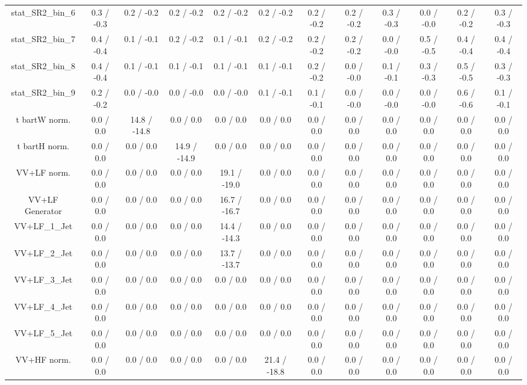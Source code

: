 \begin{table}[htbp]
\begin{center}
\begin{tabular}{|c|c|c|c|c|c|c|c|c|c|c|c|}
 stat_SR2_bin_6 & 0.3 / -0.3 & 0.2 / -0.2 & 0.2 / -0.2 & 0.2 / -0.2 & 0.2 / -0.2 & 0.2 / -0.2 & 0.2 / -0.2 & 0.3 / -0.3 & 0.0 / -0.0 & 0.2 / -0.2 & 0.3 / -0.3 \\ 
 stat_SR2_bin_7 & 0.4 / -0.4 & 0.1 / -0.1 & 0.2 / -0.2 & 0.1 / -0.1 & 0.2 / -0.2 & 0.2 / -0.2 & 0.2 / -0.2 & 0.0 / -0.0 & 0.5 / -0.5 & 0.4 / -0.4 & 0.4 / -0.4 \\ 
 stat_SR2_bin_8 & 0.4 / -0.4 & 0.1 / -0.1 & 0.1 / -0.1 & 0.1 / -0.1 & 0.1 / -0.1 & 0.2 / -0.2 & 0.0 / -0.0 & 0.1 / -0.1 & 0.3 / -0.3 & 0.5 / -0.5 & 0.3 / -0.3 \\ 
 stat_SR2_bin_9 & 0.2 / -0.2 & 0.0 / -0.0 & 0.0 / -0.0 & 0.0 / -0.0 & 0.1 / -0.1 & 0.1 / -0.1 & 0.0 / -0.0 & 0.0 / -0.0 & 0.0 / -0.0 & 0.6 / -0.6 & 0.1 / -0.1 \\ 
  t bar{t}W norm. & 0.0 / 0.0 & 14.8 / -14.8 & 0.0 / 0.0 & 0.0 / 0.0 & 0.0 / 0.0 & 0.0 / 0.0 & 0.0 / 0.0 & 0.0 / 0.0 & 0.0 / 0.0 & 0.0 / 0.0 & 0.0 / 0.0 \\ 
  t bar{t}H norm. & 0.0 / 0.0 & 0.0 / 0.0 & 14.9 / -14.9 & 0.0 / 0.0 & 0.0 / 0.0 & 0.0 / 0.0 & 0.0 / 0.0 & 0.0 / 0.0 & 0.0 / 0.0 & 0.0 / 0.0 & 0.0 / 0.0 \\ 
  VV+LF norm. & 0.0 / 0.0 & 0.0 / 0.0 & 0.0 / 0.0 & 19.1 / -19.0 & 0.0 / 0.0 & 0.0 / 0.0 & 0.0 / 0.0 & 0.0 / 0.0 & 0.0 / 0.0 & 0.0 / 0.0 & 0.0 / 0.0 \\ 
  VV+LF Generator & 0.0 / 0.0 & 0.0 / 0.0 & 0.0 / 0.0 & 16.7 / -16.7 & 0.0 / 0.0 & 0.0 / 0.0 & 0.0 / 0.0 & 0.0 / 0.0 & 0.0 / 0.0 & 0.0 / 0.0 & 0.0 / 0.0 \\ 
  VV+LF_1_Jet & 0.0 / 0.0 & 0.0 / 0.0 & 0.0 / 0.0 & 14.4 / -14.3 & 0.0 / 0.0 & 0.0 / 0.0 & 0.0 / 0.0 & 0.0 / 0.0 & 0.0 / 0.0 & 0.0 / 0.0 & 0.0 / 0.0 \\ 
  VV+LF_2_Jet & 0.0 / 0.0 & 0.0 / 0.0 & 0.0 / 0.0 & 13.7 / -13.7 & 0.0 / 0.0 & 0.0 / 0.0 & 0.0 / 0.0 & 0.0 / 0.0 & 0.0 / 0.0 & 0.0 / 0.0 & 0.0 / 0.0 \\ 
  VV+LF_3_Jet & 0.0 / 0.0 & 0.0 / 0.0 & 0.0 / 0.0 & 0.0 / 0.0 & 0.0 / 0.0 & 0.0 / 0.0 & 0.0 / 0.0 & 0.0 / 0.0 & 0.0 / 0.0 & 0.0 / 0.0 & 0.0 / 0.0 \\ 
  VV+LF_4_Jet & 0.0 / 0.0 & 0.0 / 0.0 & 0.0 / 0.0 & 0.0 / 0.0 & 0.0 / 0.0 & 0.0 / 0.0 & 0.0 / 0.0 & 0.0 / 0.0 & 0.0 / 0.0 & 0.0 / 0.0 & 0.0 / 0.0 \\ 
  VV+LF_5_Jet & 0.0 / 0.0 & 0.0 / 0.0 & 0.0 / 0.0 & 0.0 / 0.0 & 0.0 / 0.0 & 0.0 / 0.0 & 0.0 / 0.0 & 0.0 / 0.0 & 0.0 / 0.0 & 0.0 / 0.0 & 0.0 / 0.0 \\ 
  VV+HF norm. & 0.0 / 0.0 & 0.0 / 0.0 & 0.0 / 0.0 & 0.0 / 0.0 & 21.4 / -18.8 & 0.0 / 0.0 & 0.0 / 0.0 & 0.0 / 0.0 & 0.0 / 0.0 & 0.0 / 0.0 & 0.0 / 0.0 \\ 

\end{tabular}
\end{center}
\end{table}
